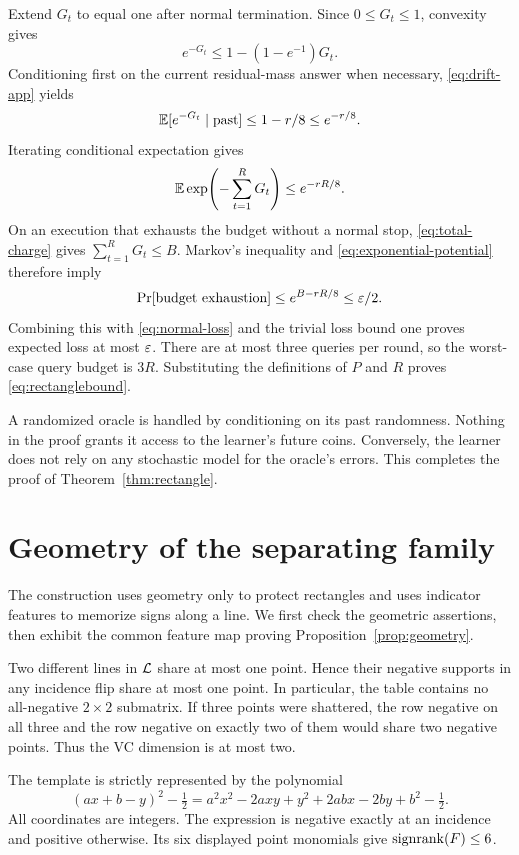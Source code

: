 Extend $G_t$ to equal one after normal termination. Since $0\le G_t\le1$, convexity gives
\[
 e^{-G_t}\le1-(1-e^{-1})G_t.
\]
Conditioning first on the current residual-mass answer when necessary, \eqref{eq:drift-app} yields
\[
 \mathbb E[e^{-G_t}\mid\text{past}]
 \le1-r/8\le e^{-r/8}.
\]
Iterating conditional expectation gives
\begin{equation}
 \mathbb E\exp\!\left(-\sum_{t=1}^{R}G_t\right)\le e^{-rR/8}.
\label{eq:exponential-potential}
\end{equation}
On an execution that exhausts the budget without a normal stop, \eqref{eq:total-charge} gives $\sum_{t=1}^R G_t\le B$. Markov's inequality and \eqref{eq:exponential-potential} therefore imply
\[
 \Pr[\text{budget exhaustion}]
 \le e^{B-rR/8}\le\varepsilon/2.
\]
Combining this with \eqref{eq:normal-loss} and the trivial loss bound one proves expected loss at most $\varepsilon$. There are at most three queries per round, so the worst-case query budget is $3R$. Substituting the definitions of $P$ and $R$ proves \eqref{eq:rectanglebound}.

A randomized oracle is handled by conditioning on its past randomness. Nothing in the proof grants it access to the learner's future coins. Conversely, the learner does not rely on any stochastic model for the oracle's errors. This completes the proof of Theorem~\ref{thm:rectangle}.

\section{Geometry of the separating family}
\label{app:geometry}
The construction uses geometry only to protect rectangles and uses indicator features to memorize signs along a line. We first check the geometric assertions, then exhibit the common feature map proving Proposition~\ref{prop:geometry}.

Two different lines in $\mathcal L$ share at most one point. Hence their negative supports in any incidence flip share at most one point. In particular, the table contains no all-negative $2\times2$ submatrix. If three points were shattered, the row negative on all three and the row negative on exactly two of them would share two negative points. Thus the VC dimension is at most two.

The template is strictly represented by the polynomial
\[
 (ax+b-y)^2-\tfrac12
 =a^2x^2-2axy+y^2+2abx-2by+b^2-\tfrac12.
\]
All coordinates are integers. The expression is negative exactly at an incidence and positive otherwise. Its six displayed point monomials give $\operatorname{signrank}(F)\le6$.

